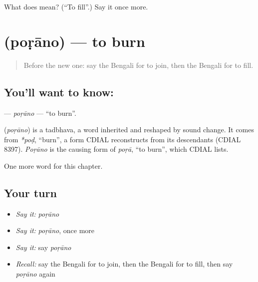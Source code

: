 \begin{tcolorbox}[breakable,colback=teal!4,colframe=teal!35!black,title={Before you move on}]
What does  mean? (\textquotedblleft{}To fill\textquotedblright{}.) Say it once more.
\end{tcolorbox}
\section[\texorpdfstring{\bn{পোড়ানো} (poṛāno)}{পোড়ানো (poṛāno)}]{ (poṛāno) — to burn}

\label{lesson:BN-C101-porano}



\begin{quote}
Before the new one: say the Bengali for to join, then the Bengali for to fill.
\end{quote}

\subsection*{You'll want to know: }
\textbf{} — \emph{poṛāno} — \textquotedblleft{}to burn\textquotedblright{}.

\begin{cousinweb}
\textbf{} (\emph{poṛāno}) is a tadbhava, a word inherited and reshaped by sound change. It comes from \emph{*poḍ}, \textquotedblleft{}burn\textquotedblright{}, a form CDIAL reconstructs from its descendants (CDIAL 8397). \emph{Poṛāno} is the causing form of \emph{poṛā}, \textquotedblleft{}to burn\textquotedblright{}, which CDIAL lists.
\end{cousinweb}

\begin{grammarlens}[title={What you've built}]
One more word for this chapter.
\end{grammarlens}

\subsection*{Your turn}
\begin{itemize}
\raggedright
  \item \emph{Say it:} \emph{poṛāno}
  \item \emph{Say it:} \emph{poṛāno}, once more
  \item \emph{Say it:} say \emph{poṛāno}
  \item \emph{Recall:} say the Bengali for to join, then the Bengali for to fill, then say \emph{poṛāno} again
\end{itemize}

